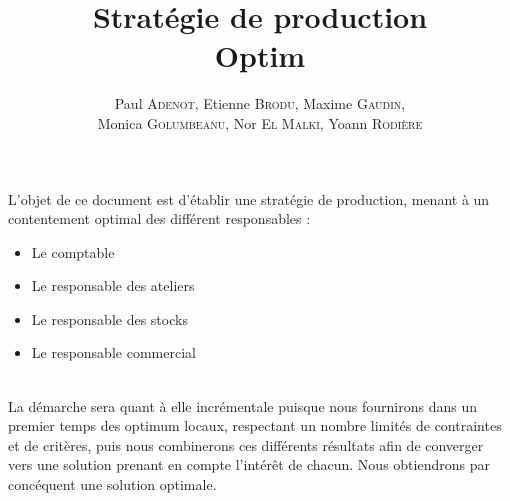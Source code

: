\documentclass[a4paper,11pt]{article}
\title{\textbf{Stratégie de production}\\Optim}
\author{Paul \textsc{Adenot}, Etienne \textsc{Brodu}, Maxime \textsc{Gaudin},\\
Monica \textsc{Golumbeanu}, Nor \textsc{El Malki}, Yoann \textsc{Rodière}}
\begin{document}
\maketitle
\newpage

\vspace*{\fill}
\tableofcontents 
\vspace*{\fill}
\newpage

\begin{nAbstract}
L'objet de ce document est d'établir une stratégie de production, menant à un
contentement optimal des différent responsables :
\begin{itemize}
  \item Le comptable
  \item Le responsable des ateliers
  \item Le responsable des stocks
  \item Le responsable commercial
\end{itemize}
~\\
La démarche sera quant à elle incrémentale puisque nous fournirons dans un
premier temps des optimum locaux, respectant un nombre limités de
contraintes et de critères, puis nous combinerons ces différents résultats afin
de converger vers une solution prenant en compte l'intérêt de chacun. Nous obtiendrons par concéquent une solution optimale.
\end{nAbstract}








\graphicspath{{../SourcesMatlab/}}
\graphicspath{{.}}
\end{document}
